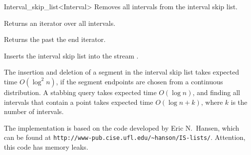 \begin{ccRefClass} {Interval_skip_list<Interval>}
{Removes all intervals from the interval skip list.}



{Returns an iterator over all intervals.}

{Returns the past the end iterator.}




{Inserts the interval skip list  into the stream .
}


\ccImplementation

The insertion and deletion of a segment in the interval skip list
takes expected time $O(\log^2 n)$, if the segment endpoints are
chosen from a continuous distribution. A stabbing query takes expected 
time $O(\log n)$, and finding all intervals that contain a point
takes expected time $O(\log n + k)$, where $k$ is the number of
intervals.

The implementation is based on the code developed by Eric N.~Hansen,
which can be found at \verb+http://www-pub.cise.ufl.edu/~hanson/IS-lists/+.
Attention, this code has memory leaks.
\end{ccRefClass}

